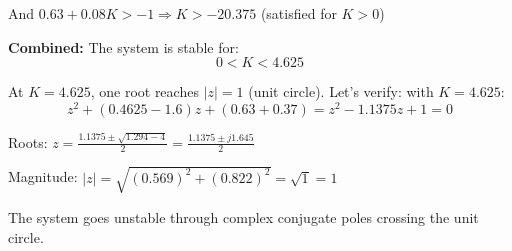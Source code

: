 \begin{example}
And $0.63 + 0.08K > -1 \Rightarrow K > -20.375$ (satisfied for $K > 0$)

\textbf{Combined:} The system is stable for:
\begin{equation}
\boxed{0 < K < 4.625}
\end{equation}

At $K = 4.625$, one root reaches $|z| = 1$ (unit circle). Let's verify: with $K = 4.625$:
\begin{equation}
z^2 + (0.4625 - 1.6)z + (0.63 + 0.37) = z^2 - 1.1375z + 1 = 0
\end{equation}

Roots: $z = \frac{1.1375 \pm \sqrt{1.294 - 4}}{2} = \frac{1.1375 \pm j1.645}{2}$

Magnitude: $|z| = \sqrt{(0.569)^2 + (0.822)^2} = \sqrt{1} = 1$ \checkmark

The system goes unstable through complex conjugate poles crossing the unit circle.
\end{example}

